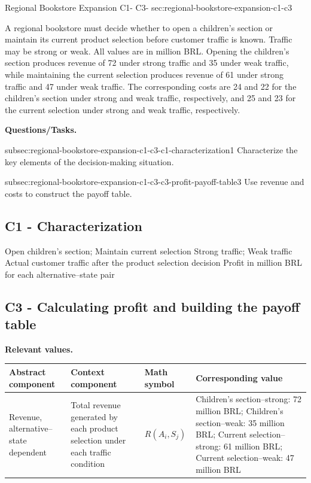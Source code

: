 	\sectionScored
	{Regional Bookstore Expansion}
	{C1- \hspace{2mm} C3-}
	{sec:regional-bookstore-expansion-c1-c3}
	{
		A regional bookstore must decide whether to open a children's section or maintain its current product selection before customer traffic is known. Traffic may be strong or weak. All values are in million BRL. Opening the children's section produces revenue of 72 under strong traffic and 35 under weak traffic, while maintaining the current selection produces revenue of 61 under strong traffic and 47 under weak traffic. The corresponding costs are 24 and 22 for the children's section under strong and weak traffic, respectively, and 25 and 23 for the current selection under strong and weak traffic, respectively.
		
		\textbf{Questions/Tasks.}
		\begin{enumerate}
			\CriterionTask
			{subsec:regional-bookstore-expansion-c1-c3-c1-characterization}{1}
			{Characterize the key elements of the decision-making situation. }
			
			\CriterionTask
			{subsec:regional-bookstore-expansion-c1-c3-c3-profit-payoff-table}{3}
			{Use revenue and costs to construct the payoff table. }
		\end{enumerate}
		
		\label{subsec:regional-bookstore-expansion-c1-c3-c1-characterization}
		\subsection*{C1 - Characterization }
		
		\DecisionElementsTable
		{Open children's section; Maintain current selection}
		{Strong traffic; Weak traffic}
		{Actual customer traffic after the product selection decision}
		{Profit in million BRL for each alternative--state pair}
		
		\label{subsec:regional-bookstore-expansion-c1-c3-c3-profit-payoff-table}
		\subsection*{C3 - Calculating profit and building the payoff table }
		
		\textbf{Relevant values.}
		
		\begin{center}
			\small
			\begin{tabularx}{\textwidth}{
					>{\raggedright\arraybackslash}X
					>{\raggedright\arraybackslash}X
					>{\centering\arraybackslash}p{}
					>{\raggedright\arraybackslash}X
				}
				\toprule
				Abstract component & Context component & Math symbol & Corresponding value \\
				\midrule
				Revenue, alternative--state dependent
				&
				Total revenue generated by each product selection under each traffic condition
				&
				$R(A_i,S_j)$
				&
				Children's section--strong: 72 million BRL; Children's section--weak: 35 million BRL; Current selection--strong: 61 million BRL; Current selection--weak: 47 million BRL
				\\
				

\end{tabularx}
\end{center}}
